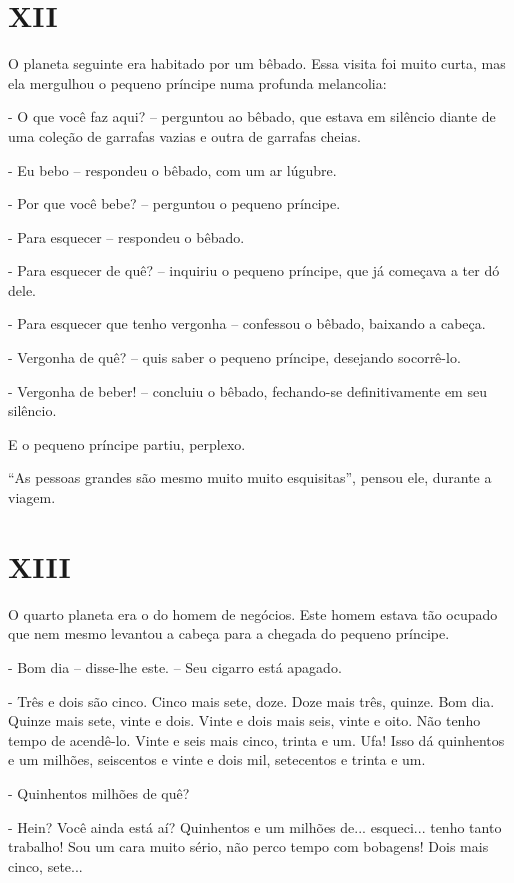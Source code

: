 \chapter{XII}

O planeta seguinte era habitado por um bêbado. Essa visita foi muito
curta, mas ela mergulhou o pequeno príncipe numa profunda melancolia:

- O que você faz aqui? -- perguntou ao bêbado, que estava em silêncio
diante de uma coleção de garrafas vazias e outra de garrafas cheias.

- Eu bebo -- respondeu o bêbado, com um ar lúgubre.

- Por que você bebe? -- perguntou o pequeno príncipe.

- Para esquecer -- respondeu o bêbado.

- Para esquecer de quê? -- inquiriu o pequeno príncipe, que já começava
a ter dó dele.

- Para esquecer que tenho vergonha -- confessou o bêbado, baixando a
cabeça.

- Vergonha de quê? -- quis saber o pequeno príncipe, desejando
socorrê-lo.

- Vergonha de beber! -- concluiu o bêbado, fechando-se definitivamente
em seu silêncio.

E o pequeno príncipe partiu, perplexo.

``As pessoas grandes são mesmo muito muito esquisitas'', pensou ele,
durante a viagem.

\chapter{XIII}

O quarto planeta era o do homem de negócios. Este homem estava tão
ocupado que nem mesmo levantou a cabeça para a chegada do pequeno
príncipe.

- Bom dia -- disse-lhe este. -- Seu cigarro está apagado.

- Três e dois são cinco. Cinco mais sete, doze. Doze mais três, quinze.
Bom dia. Quinze mais sete, vinte e dois. Vinte e dois mais seis, vinte e
oito. Não tenho tempo de acendê-lo. Vinte e seis mais cinco, trinta e
um. Ufa! Isso dá quinhentos e um milhões, seiscentos e vinte e dois mil,
setecentos e trinta e um.

- Quinhentos milhões de quê?

- Hein? Você ainda está aí? Quinhentos e um milhões de... esqueci...
tenho tanto trabalho! Sou um cara muito sério, não perco tempo com
bobagens! Dois mais cinco, sete...

